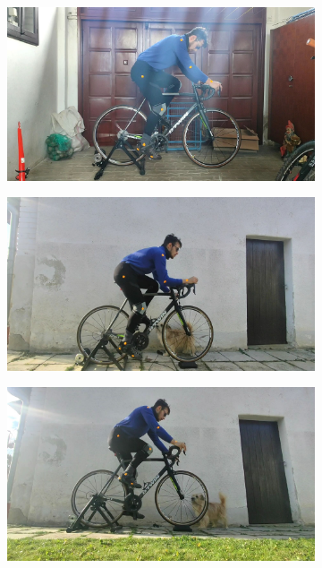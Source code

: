 \begin{figure}[htb]
    \centering
    \begin{subfigure}[b]{\imgwidth}
        \centering

        \includegraphics[width=1\linewidth]{obrazky-figures/1.jpg}

    \end{subfigure}
    \hfill
    \begin{subfigure}[b]{\imgwidth}
        \centering

        \includegraphics[width=1\linewidth]{obrazky-figures/2.jpg}

    \end{subfigure}
    \hfill
    \begin{subfigure}[b]{\imgwidth}
        \centering

        \includegraphics[width=1\linewidth]{obrazky-figures/3.jpg}
    \end{subfigure}


\end{figure}
